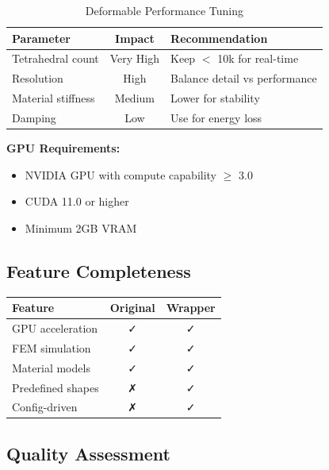 \begin{table}[h]
\centering
\begin{tabular}{|l|c|l|}
\hline
\textbf{Parameter} & \textbf{Impact} & \textbf{Recommendation} \\
\hline
Tetrahedral count & Very High & Keep $<$ 10k for real-time \\
Resolution & High & Balance detail vs performance \\
Material stiffness & Medium & Lower for stability \\
Damping & Low & Use for energy loss \\
\hline
\end{tabular}
\caption{Deformable Performance Tuning}
\end{table}

\textbf{GPU Requirements:}
\begin{itemize}
    \item NVIDIA GPU with compute capability $\geq$ 3.0
    \item CUDA 11.0 or higher
    \item Minimum 2GB VRAM
\end{itemize}


\subsection{Feature Completeness}

\begin{table}[h]
\centering
\begin{tabular}{|l|c|c|}
\hline
\textbf{Feature} & \textbf{Original} & \textbf{Wrapper} \\
\hline
GPU acceleration & ✓ & ✓ \\
FEM simulation & ✓ & ✓ \\
Material models & ✓ & ✓ \\
Predefined shapes & ✗ & ✓ \\
Config-driven & ✗ & ✓ \\
\hline
\end{tabular}
\end{table}


\subsection{Quality Assessment}

